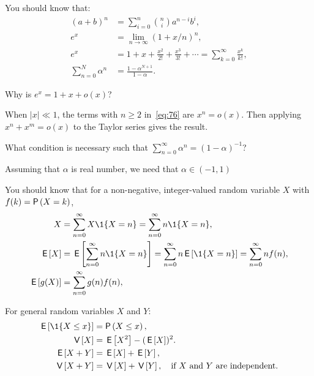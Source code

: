 \documentclass[companion.tex]{subfiles}
\begin{document}
You should know that:
\begin{subequations}
 \begin{align}
 (a+b)^n &= \sum_{i=0}^n {n \choose i} a^{n-i} b^i, \label{eq:71}\\
e^x &= \lim_{n\to\infty} (1+x/n)^n, \label{eq:65}\\
 e^x &= 1 + x + \frac{x^2}{2!} + \frac{x^3}{3!} + \cdots = \sum_{k=0}^{\infty} \frac{x^k}{k!}, \label{eq:76}\\
 \sum_{n=0}^N \alpha^n &= \frac{1-\alpha^{N+1}}{1-\alpha}. \label{eq:61}
\end{align}
\end{subequations}

\begin{extra}
 Why is $e^{x} = 1 +x + o(x)$?
\begin{solution}
 When $|x|\ll 1$, the terms with $n\geq 2$ in~\cref{eq:76} are $x^n = o(x)$. Then applying $x^n + x^m = o(x)$ to the Taylor series gives the result.
\end{solution}
\end{extra}

\begin{extra}
 What condition is necessary such that $\sum_{n=0}^\infty \alpha^n = (1-\alpha)^{-1}$?
 \begin{solution}
Assuming that $\alpha$ is real number, we need that  $\alpha\in (-1, 1)$
\end{solution}
\end{extra}


You should know that for a non-negative, integer-valued random variable $X$ with  $f(k)= \P{X = k}$, 
\begin{subequations}\label{eq:105}
\begin{align}
X&=\sum_{n=0}^\infty X\1{X=n} = \sum_{n=0}^\infty n \1{X=n}, \label{eq:77} \\
\E X &= \E{\sum_{n=0}^\infty n \1{X=n}} = \sum_{n=0}^\infty n \E{\1{X=n}} = \sum_{n=0}^\infty n f(n), \label{eq:p-78} \\
  \E{g(X)} &= \sum_{n=0}^\infty g(n) f(n), \label{eq:66}
\end{align}             
\end{subequations}

For general random variables $X$ and $Y$:
\begin{align}
\E{\1{X\leq x}} &= \P{X\leq x}, \label{eq:74}\\
  \V X &= \E{X^2} - (\E X)^2.\label{eq:68}\\
  \E{X+Y} &= \E X + \E Y, \label{eq:95}\\
  \V{X+Y} &= \V X + \V Y, \quad\text{if $X$ and $Y$ are independent.}\label{eq:94}
\end{align}
\end{document}

